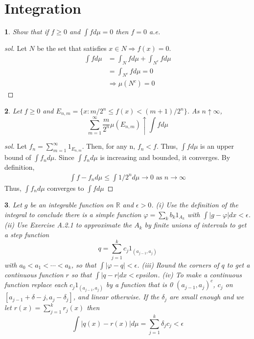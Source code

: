 \documentclass{report}
\newtheorem{ex}{}[section]
\begin{document}
\section{Integration}
\begin{ex}
Show that if $f \ge 0$ and $\int f d\mu = 0$ then $f = 0$ a.e.
\end{ex}
\begin{proof}[sol]
Let $N$ be the set that satisfies $x \in N \Rightarrow f(x) = 0$.
\begin{align*}
    \int f d\mu &=  \int_N f d\mu  + \int_{N^c} f d\mu\\
    &= \int_{N^c} f d\mu = 0\\
    &\Rightarrow \mu(N^c) = 0
\end{align*}
\end{proof}
\begin{ex}
Let $f \ge 0$ and $E_{n,m} = \{x : m/2^n \le f(x) < (m+1)/2^n\}$. As $n \uparrow \infty$,
\[\sum_{m=1}^\infty \frac{m}{2^n} \mu(E_{n,m}) \uparrow \int f d\mu\]
\end{ex}
\begin{proof}[sol]
Let $f_n = \sum_{m=1}^\infty 1_{E_{n,m}}$. Then, for any n, $f_n < f$. Thus, $\int f d\mu$ is an upper bound of $\int f_n d\mu$. Since $\int f_n d\mu$ is increasing and bounded, it converges. By definition,
\begin{align*}
    \int f -f_n d\mu \le \int 1/2^n d\mu \to 0 \text{ as } n \to \infty
\end{align*}
Thus, $\int f_n d\mu$ converges to $\int f d\mu$
\end{proof}
\begin{ex}
Let $g$ be an integrable function on $\mathbb{R}$ and $\epsilon > 0$. (i) Use the definition of the integral to conclude there is a simple function $\varphi = \sum_k b_k1_{A_k}$ with $\int |g - \varphi| dx < \epsilon$. (ii) Use Exercise A.2.1 to approximate the $A_k$ by finite unions of intervals to get a step function
\[q = \sum_{j=1}^k c_j 1_{(a_{j-1}, a_j)}\]
with $a_0 < a_1 < \dotsb < a_k$, so that $\int |\varphi-q| < \epsilon$. (iii) Round the corners of $q$ to get a continuous function $r$ so that $\int |q - r| dx < epsilon$.
(iv) To make a continuous function replace each $c_j1_{(a_{j-1},a_j)}$ by a function
that is 0 $(a_{j-1}, a_j)^c$, $c_j$ on $[a_{j-1} + \delta - j, a_j - \delta_j ]$, and linear otherwise. If the $\delta_j$ are small enough and we let $r(x) = \sum^k_{j=1} r_j(x)$ then
\[\int |q(x) - r(x)|d\mu = \sum_{j=1}^k \delta_j c_j <\epsilon\]
\end{ex}
\end{document}
